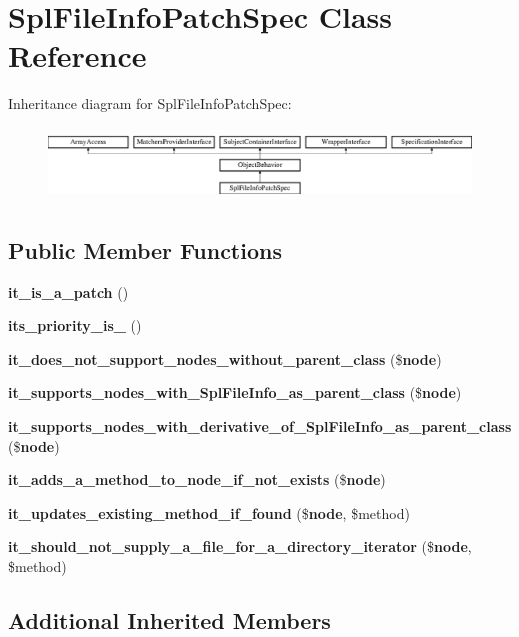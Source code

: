 \section{Spl\+File\+Info\+Patch\+Spec Class Reference}
\label{classspec_1_1_prophecy_1_1_doubler_1_1_class_patch_1_1_spl_file_info_patch_spec}
Inheritance diagram for Spl\+File\+Info\+Patch\+Spec\+:\begin{figure}[H]
\begin{center}
\leavevmode
\includegraphics[height=1.953488cm]{classspec_1_1_prophecy_1_1_doubler_1_1_class_patch_1_1_spl_file_info_patch_spec}
\end{center}
\end{figure}
\subsection*{Public Member Functions}
\begin{DoxyCompactItemize}
\item 
{\bf it\+\_\+is\+\_\+a\+\_\+patch} ()
\item 
{\bf its\+\_\+priority\+\_\+is\+\_} ()
\item 
{\bf it\+\_\+does\+\_\+not\+\_\+support\+\_\+nodes\+\_\+without\+\_\+parent\+\_\+class} (\${\bf node})
\item 
{\bf it\+\_\+supports\+\_\+nodes\+\_\+with\+\_\+\+Spl\+File\+Info\+\_\+as\+\_\+parent\+\_\+class} (\${\bf node})
\item 
{\bf it\+\_\+supports\+\_\+nodes\+\_\+with\+\_\+derivative\+\_\+of\+\_\+\+Spl\+File\+Info\+\_\+as\+\_\+parent\+\_\+class} (\${\bf node})
\item 
{\bf it\+\_\+adds\+\_\+a\+\_\+method\+\_\+to\+\_\+node\+\_\+if\+\_\+not\+\_\+exists} (\${\bf node})
\item 
{\bf it\+\_\+updates\+\_\+existing\+\_\+method\+\_\+if\+\_\+found} (\${\bf node}, \$method)
\item 
{\bf it\+\_\+should\+\_\+not\+\_\+supply\+\_\+a\+\_\+file\+\_\+for\+\_\+a\+\_\+directory\+\_\+iterator} (\${\bf node}, \$method)
\end{DoxyCompactItemize}
\subsection*{Additional Inherited Members}


